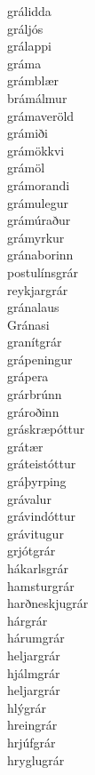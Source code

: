 \documentclass[../samsetningasafn.tex]{subfiles}
\begin{document}
\begin{bigwordlist}
\begin{footnotesize}
\begin{multicols}{4}
\begin{description}
		\item [grálidda]
		\item [gráljós]
		\item [grálappi]
		\item [gráma]
		\item [grámblær]
		\item [brámálmur]
		\item [grámaveröld]
		\item [grámiði]
		\item [grámökkvi]
		\item [grámöl]
		\item [grámorandi]
		\item [grámulegur]
		\item [grámúraður]
		\item [grámyrkur]
		\item [gránaborinn]
		\item [postulínsgrár]
		\item [reykjargrár]
		\item [gránalaus]
		\item [Gránasi]
		\item [granítgrár]
		\item [grápeningur]
		\item [grápera]
		\item [grárbrúnn]
		\item [grároðinn]
		\item [gráskræpóttur]
		\item [grátær]
		\item [gráteistóttur]
		\item [gráþyrping]
		\item [grávalur]
		\item [grávindóttur]
		\item [grávitugur]
		\item [grjótgrár]
		\item [hákarlsgrár]
		\item [hamsturgrár]
		\item [harðneskjugrár]
		\item [hárgrár]
		\item [hárumgrár]
		\item [heljargrár]
		\item [hjálmgrár]
		\item [heljargrár]
		\item [hlýgrár]
		\item [hreingrár]
		\item [hrjúfgrár]
		\item [hryglugrár]

\end{description}
\end{multicols}
\end{footnotesize}
\end{bigwordlist}
\end{document}
